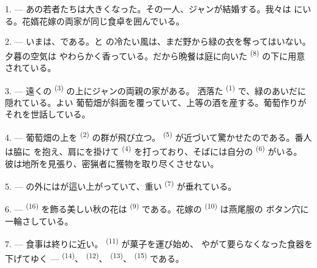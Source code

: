 %

\VUsaut{4.0mm}
\VUsaut{1.6mm}
\VUsaut{3.2mm}

\VUsaut{1.6mm}
\VUsaut{2.6mm}

\VUsaut{3.0mm}

1. --- あの若者たちは大きくなった。その一人、ジャンが結婚する。我々は
にいる。花婿花嫁の両家が同じ食卓を囲んでいる。

2. --- いまは、である。と
の冷たい風は、まだ野から緑の衣を奪ってはいない。夕暮の空気は
やわらかく香っている。だから晩餐は庭に向いた \textsuperscript{(8)}
の下に用意されている。

3. --- 遠くの \textsuperscript{(3)} の上にジャンの両親の家がある。
洒落た \textsuperscript{(1)} で、緑のあいだに隠れている。よい
葡萄畑が斜面を覆っていて、上等の酒を産する。葡萄作りがそれを世話している。

4. --- 葡萄畑の上を \textsuperscript{(2)} の群が飛び立つ。
 \textsuperscript{(5)} が近づいて驚かせたのである。番人は脇に
を抱え、肩にを掛けて
\textsuperscript{(4)} を打っており、そばには自分の
\textsuperscript{(6)} がいる。
彼は地所を見張り、密猟者に獲物を取り尽くさせない。

5. --- の外にはが這い上がっていて、重い
 \textsuperscript{(7)} が垂れている。

6. ---  \textsuperscript{(16)} を飾る美しい秋の花は
\textsuperscript{(9)} である。花嫁の \textsuperscript{(10)} は燕尾服の
ボタン穴に一輪さしている。

7. --- 食事は終りに近い。 \textsuperscript{(11)} が菓子を運び始め、
やがて要らなくなった食器を下げてゆく ---  \textsuperscript{(14)}、
 \textsuperscript{(12)}、 \textsuperscript{(13)}、
 \textsuperscript{(15)} である。

